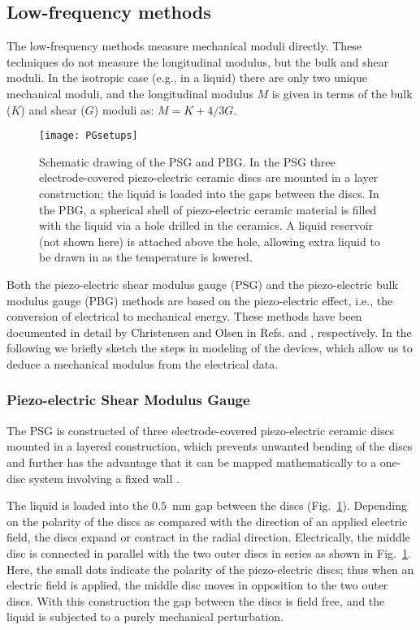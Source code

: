 \documentclass[reprint,showpacs,amsmath,amssymb,aip,jcp]{revtex4-1}
\begin{document}
\subsection{Low-frequency methods}\label{sec:PG}

The low-frequency methods measure mechanical moduli directly. These
techniques do not measure the longitudinal modulus, but the bulk and
shear moduli. In the isotropic case (e.g., in a liquid) there are only
two unique mechanical moduli, and the longitudinal modulus $M$ is
given in terms of the bulk ($K$) and shear ($G$) moduli as:
$M=K+4/3G$.

\begin{figure}[htpb!]
  \begin{center}
    \texttt{[image: PGsetups]}
  \end{center}
  \caption{\label{PGsetups}Schematic drawing of the PSG and PBG. In
    the PSG three electrode-covered piezo-electric ceramic discs are
    mounted in a layer construction; the liquid is loaded into the
    gaps between the discs. In the PBG, a spherical shell of
    piezo-electric ceramic material is filled with the liquid via a
    hole drilled in the ceramics. A liquid reservoir (not shown here)
    is attached above the hole, allowing extra liquid to be drawn in
    as the temperature is lowered.}
\end{figure}

Both the piezo-electric shear modulus gauge (PSG) and the
piezo-electric bulk modulus gauge (PBG) methods are based on the
piezo-electric effect, i.e., the conversion of electrical to
mechanical energy. These methods have been documented in detail by
Christensen and Olsen in Refs.  and
, respectively. In the following we
briefly sketch the steps in modeling of the devices, which allow us to
deduce a mechanical modulus from the electrical data.

\subsubsection{Piezo-electric Shear Modulus Gauge}

The PSG is constructed of three electrode-covered piezo-electric
ceramic discs mounted in a layered construction, which prevents
unwanted bending of the discs and further has the advantage that it
can be mapped mathematically to a one-disc system involving a fixed
wall \cite{sChristensen1995}.

The liquid is loaded into the $0.5$~mm gap between the discs
(Fig.\ \ref{PGsetups}). Depending on the polarity of the discs as
compared with the direction of an applied electric field, the discs
expand or contract in the radial direction. Electrically, the middle
disc is connected in parallel with the two outer discs in series as
shown in Fig.\ \ref{PGsetups}. Here, the small dots indicate the
polarity of the piezo-electric discs; thus when an electric field
is applied, the middle disc moves in opposition to the two outer
discs.  With this construction the gap between the discs is
field free, and the liquid is subjected to a purely mechanical
perturbation.
\end{document}
